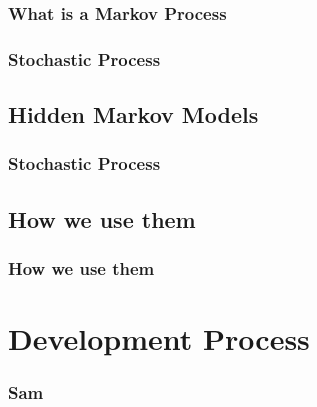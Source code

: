\documentclass{beamer}
\begin{document}
\begin{frame}
   \frametitle{What is a Markov Process}
\end{frame}

\begin{frame}
   \frametitle{}
\end{frame}

\begin{frame}
   \frametitle{Stochastic Process}
\end{frame}

\subsection{Hidden Markov Models}
\begin{frame}
   \frametitle{}
\end{frame}

\begin{frame}
   \frametitle{Stochastic Process}
\end{frame}

\subsection{How we use them}
\begin{frame}
   \frametitle{How we use them}
\end{frame}

\section{Development Process}

\begin{frame}
   \frametitle{Sam}
\end{frame}
\end{document}
